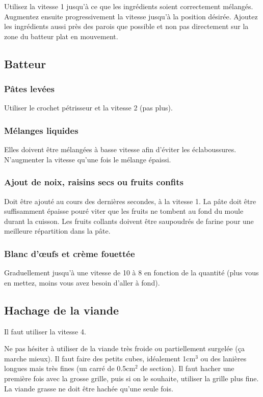 \documentclass[a4paper,twoside,openright]{report}
\begin{document}
Utilisez la vitesse 1 jusqu'à ce que les ingrédients soient correctement mélangés. Augmentez ensuite progressivement la vitesse 
jusqu'à la position désirée. Ajoutez les ingrédients aussi près des parois que possible et non pas directement sur la zone du 
batteur plat en mouvement. 

\subsection{Batteur}
\subsubsection{Pâtes levées}
Utiliser le crochet pétrisseur et la vitesse 2 (pas plus). 

\subsubsection{Mélanges liquides}
Elles doivent être mélangées à basse vitesse afin d'éviter les éclaboussures. N'augmenter la vitesse qu'une fois le mélange 
épaissi. 

\subsubsection{Ajout de noix, raisins secs ou fruits confits}
Doit être ajouté au cours des dernières secondes, à la vitesse 1. La pâte doit être suffisamment épaisse pouré viter que les 
fruits ne tombent au fond du moule durant la cuisson. Les fruits collants doivent être saupoudrés de farine pour une meilleure 
répartition dans la pâte.

\subsubsection{Blanc d'œufs et crème fouettée}
Graduellement jusqu'à une vitesse de 10 à 8 en fonction de la quantité (plus vous en mettez, moins vous avez besoin d'aller à 
fond).

\subsection{Hachage de la viande}
Il faut utiliser la vitesse 4. 

Ne pas hésiter à utiliser de la viande très froide ou partiellement surgelée (ça marche mieux). Il faut faire des petits cubes, 
idéalement 1cm$^3$ ou des lanières longues mais très fines (un carré de 0.5cm$^2$ de section).
Il faut hacher une première fois avec la grosse grille, puis si on le souhaite, utiliser la grille plus fine. La viande grasse 
ne doit être hachée qu'une seule fois.
\end{document}
